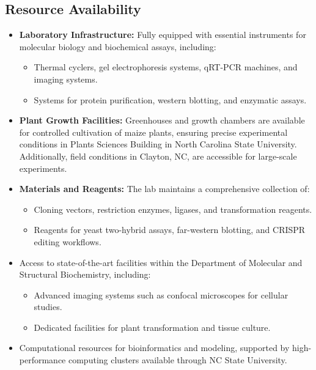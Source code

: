 \documentclass{article}
\begin{document}
\subsection{Resource Availability}
\begin{itemize}
    \item \textbf{Laboratory Infrastructure:} Fully equipped with essential instruments for molecular biology and biochemical assays, including:
    \begin{itemize}
        \item Thermal cyclers, gel electrophoresis systems, qRT-PCR machines, and imaging systems.
        \item Systems for protein purification, western blotting, and enzymatic assays.
    \end{itemize}
    \item \textbf{Plant Growth Facilities:} Greenhouses and growth chambers are available for controlled cultivation of maize plants, ensuring precise experimental conditions in Plants Sciences Building in North Carolina State University. Additionally, field conditions in Clayton, NC, are accessible for large-scale experiments.
    \item \textbf{Materials and Reagents:} The lab maintains a comprehensive collection of:
    \begin{itemize}
        \item Cloning vectors, restriction enzymes, ligases, and transformation reagents.
        \item Reagents for yeast two-hybrid assays, far-western blotting, and CRISPR editing workflows.
    \end{itemize}
    \item Access to state-of-the-art facilities within the Department of Molecular and Structural Biochemistry, including:
    \begin{itemize}
        \item Advanced imaging systems such as confocal microscopes for cellular studies.
        \item Dedicated facilities for plant transformation and tissue culture.
    \end{itemize}
    \item Computational resources for bioinformatics and modeling, supported by high-performance computing clusters available through NC State University.
\end{itemize}
\end{document}
